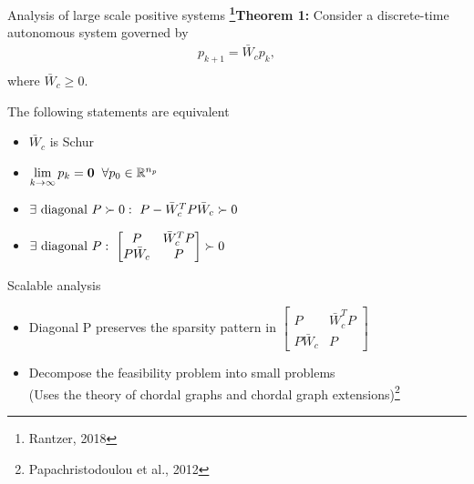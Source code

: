 \begin{frame}{Analysis of large scale positive systems}
	\textbf{\footnote{Rantzer, 2018}Theorem 1:}
	Consider a discrete-time autonomous system governed by 
	\begin{equation*}
	\begin{split}
	p_{k+1}=\bar{W}_cp_k, \\
	\end{split}
	\end{equation*}
	where $\bar{W}_c\geq 0$.		
	
	The following statements are equivalent
	\begin{itemize}
		\setlength\itemsep{0.3em}
		\item[(1)] $\bar{W}_c$ is Schur
		\item[(2)] $\lim\limits_{k\rightarrow \infty} p_k=\mathbf{0} \hspace{0.2cm} \forall p_0 \in \mathbb{R}^{n_p}$
		\item[(3)] $\exists \textnormal{ diagonal }P \succ 0 :\ P- \bar{W}_c^TP\bar{W}_c \succ 0$
		\item[(4)] $\exists \textnormal{ diagonal } P:\ \begin{bmatrix}
		P & \bar{W}_c^TP \\
		P\bar{W}_c& P
		\end{bmatrix} \succ 0$
	\end{itemize}	
\end{frame}
\begin{frame}{Scalable analysis}
\begin{itemize}	
	\item Diagonal P preserves the sparsity pattern in $\begin{bmatrix}
	P & \bar{W}_c^TP \\
	P\bar{W}_c& P
	\end{bmatrix}$
	\item Decompose the feasibility problem into small problems 
	\\(Uses the theory of chordal graphs and chordal graph extensions)\footnote{Papachristodoulou et al., 2012}
\end{itemize}
\end{frame}
